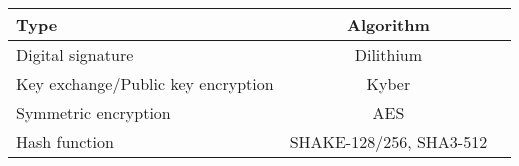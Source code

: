 \begin{tabular}{|l|c|c|}
  \hline
  Type                               & Algorithm               \\
  \hline
  Digital signature                  & Dilithium               \\
  Key exchange/Public key encryption & Kyber                   \\
  Symmetric encryption               & AES                     \\
  Hash function                      & SHAKE-128/256, SHA3-512 \\
  \hline
\end{tabular}
